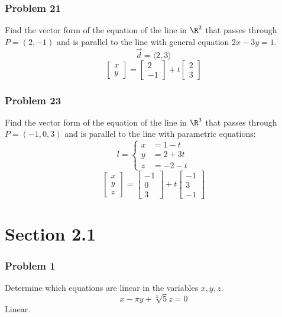 \documentclass[letterpaper, 12pt]{math}
\begin{document}
\subsubsection*{Problem 21}
Find the vector form of the equation of the line in \( \R^2 \) that passes
through \( P = (2,-1) \) and is parallel to the line with general equation
\( 2x-3y = 1 \).
\[ \vec{d} = \langle2,3\rangle \]
\[ \begin{bmatrix}x \\ y\end{bmatrix} =
  \begin{bmatrix}2 \\ -1\end{bmatrix}+
  t\begin{bmatrix}2 \\ 3\end{bmatrix} \]

\subsubsection*{Problem 23}
Find the vector form of the equation of the line in \( \R^3 \) that passes
through \( P = (-1,0,3) \) and is parallel to the line with parametric
equations:
\[ l = \begin{cases}
  x &= 1-t \\
  y &= 2+3t \\
  z &= -2-t
\end{cases} \]
\[ \begin{bmatrix}x \\ y \\ z\end{bmatrix} =
  \begin{bmatrix}-1 \\ 0 \\ 3\end{bmatrix}+
  t\begin{bmatrix}-1 \\ 3 \\ -1\end{bmatrix} \]

\section*{Section 2.1}

\subsubsection*{Problem 1}
Determine which equations are linear in the variables \( x,y,z \).
\[ x-\pi y+\sqrt[3]{5}z = 0 \]
Linear.
\end{document}
